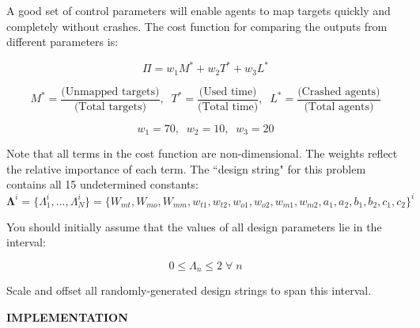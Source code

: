\documentclass{article}
\begin{document}
\vspace{.1 in}

A good set of control parameters will enable agents to map targets quickly and completely without crashes. The cost function for comparing the outputs from different parameters is: 

\begin{equation} \label{PI}
    \Pi = w_1M^* + w_2T^* + w_3L^* 
\end{equation}

\begin{equation}
    M^* = \frac{\text{(Unmapped targets)}}{\text{(Total targets)}}, \;\; T^* = \frac{\text{(Used time)}}{\text{(Total time)}}, \;\; L^* = \frac{\text{(Crashed agents)}}{\text{(Total agents)}} \label{stars}
\end{equation}

\begin{equation*}
    w_1 = 70, \;\; w_2 = 10, \;\; w_3 = 20
\end{equation*}

Note that all terms in the cost function are non-dimensional. The weights reflect the relative importance of each term. The ``design string" for this problem contains all 15 undetermined constants: 
\begin{equation} 
\boldsymbol{\Lambda}^{i} =  \{\Lambda^i_1,..., \Lambda^i_N\} = \{ W_{mt}, W_{mo}, W_{mm}, w_{t1}, w_{t2}, w_{o1}, w_{o2}, w_{m1}, w_{m2}, a_1, a_2,  b_1, b_2,  c_1, c_2\}^i
\end{equation} 

You should initially assume that the values of all design parameters lie in the interval: 

\begin{equation}
    0 \leq \Lambda_n \leq 2 \;\forall \; n
\end{equation}

Scale and offset all randomly-generated design strings to span this interval.

\vspace{.1 in}
 \centerline{ \bf IMPLEMENTATION }
 \vspace{.1 in}
 
\end{document}
